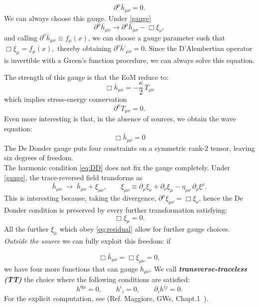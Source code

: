 \documentclass[12pt,a4paper,oneside]{article}
\numberwithin{equation}{section}   %
\begin{document}
\begin{equation}
\boxed{\partial^\mu\bar{h}_{\mu\nu} = 0.}
\label{eq:DD}
\end{equation}
We can always choose this gauge. Under \eqref{gauge}
\begin{equation}
\partial^\mu \bar{h}_{\mu\nu} \to \partial^\mu \bar{h}_{\mu\nu} - \Box \xi_\nu,
\end{equation}
and calling $
\partial^\nu \bar h_{\mu\nu} \equiv f_\mu(x)
$,
we can choose a gauge parameter such that
$
\Box \xi _\mu=f_\mu(x),
$
thereby obtaining
$
\partial^\nu \bar{h}’_{\mu\nu}=0
$. 
Since the D'Alembertian operator is invertible with
a Green's function procedure, we can always solve this equation.

The strength of this gauge is that the EoM reduce to:
\begin{equation}
\Box \bar{h}_{\mu\nu} = -\frac{\kappa}{2}\, T_{\mu\nu}
\label{eq:EoM}
\end{equation}
which implies stress-energy conservation
\begin{equation}
\partial^\mu T_{\mu\nu} = 0.
\end{equation}
Even more interesting is that,
in the absence of sources, we obtain the wave equation:
\begin{equation}
    \boxed{
\Box \bar{h}_{\mu\nu} = 0
}\label{eq:EoM2}
\end{equation}
The De Donder gauge puts four constraints on 
a symmetric rank-2 tensor, leaving six degrees of freedom.
\\


The harmonic condition \eqref{eq:DD} does not fix the gauge completely.
Under \eqref{gauge}, the trace-reversed field transforms as
\begin{equation}
  \bar h_{\mu\nu}\;\to\;\bar h_{\mu\nu}+\xi_{\mu\nu},
  \qquad
  \xi_{\mu\nu}\equiv\partial_\mu\xi_\nu+\partial_\nu\xi_\mu
  -\eta_{\mu\nu}\,\partial_\rho\xi^\rho .
  \label{eq:xi-shift}
\end{equation}
This is interesting because, taking the divergence,
$\partial^\mu\xi_{\mu\nu}=\Box\xi_\nu$, hence the De Donder condition is
preserved by every further transformation satisfying:
\begin{equation}
  \Box\xi_\mu=0 .
  \label{eq:residual}
\end{equation}
All the further $\xi_\mu$ 
 which obey \eqref{eq:residual} allow for further
gauge choices. \textit{Outside the source} we can fully exploit this freedom: if 

\begin{equation} 
    \Box \bar{h}_{\mu\nu} = \Box \xi_{\mu\nu}=0, 
\end{equation}
 we have four more functions that 
 can gauge $h_{\mu\nu}$. 
We call
\textbf{\textit{transverse-traceless (TT)}} the choice where the
following conditions are satisfied:
\begin{equation}
\boxed{
  h^{0\mu}=0, \qquad h^i{}_i=0, \qquad \partial_i h^{ij}=0.
}
\label{TTC}
\end{equation}
For the explicit computation, see (Ref. Maggiore, GWs, Chapt.1~\cite{Maggiore2008}).
\end{document}
